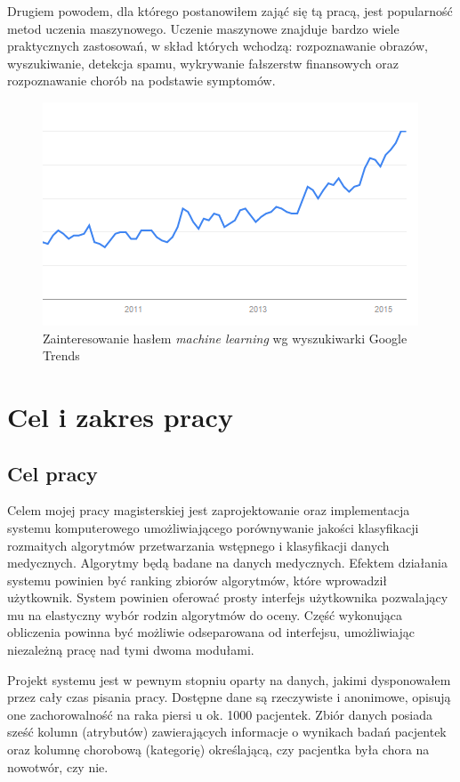 \documentclass[../thesis.tex]{subfiles}
\begin{document}
Drugiem powodem, dla którego postanowiłem zająć się tą pracą, jest popularność metod uczenia maszynowego. Uczenie maszynowe znajduje bardzo wiele praktycznych zastosowań, w skład których wchodzą: rozpoznawanie obrazów, wyszukiwanie, detekcja spamu, wykrywanie fałszerstw finansowych oraz rozpoznawanie chorób na podstawie symptomów. 

\begin{figure}[h]
\centering
\includegraphics{ml_chart.png}
\caption{Zainteresowanie hasłem \textit{machine learning} wg wyszukiwarki Google Trends}
\label{intro:ml_chart}
\end{figure}

\section{Cel i zakres pracy}

\subsection{Cel pracy}

Celem mojej pracy magisterskiej jest zaprojektowanie oraz implementacja systemu komputerowego umożliwiającego porównywanie jakości klasyfikacji rozmaitych algorytmów przetwarzania wstępnego i klasyfikacji danych medycznych. Algorytmy będą badane na danych medycznych. Efektem działania systemu powinien być ranking zbiorów algorytmów, które wprowadził użytkownik. System powinien oferować prosty interfejs użytkownika pozwalający mu na elastyczny wybór rodzin algorytmów do oceny. Część wykonująca obliczenia powinna być możliwie odseparowana od interfejsu, umożliwiając niezależną pracę nad tymi dwoma modułami.

Projekt systemu jest w pewnym stopniu oparty na danych, jakimi dysponowałem przez cały czas pisania pracy. Dostępne dane są rzeczywiste i anonimowe, opisują one zachorowalność na raka piersi u ok. 1000 pacjentek. Zbiór danych posiada sześć kolumn (atrybutów) zawierających informacje o wynikach badań pacjentek oraz kolumnę chorobową (kategorię) określającą, czy pacjentka była chora na nowotwór, czy nie.
\end{document}
